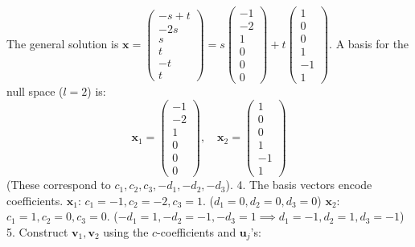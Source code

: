 \documentclass[11pt]{article}
\theoremstyle{definition}
\theoremstyle{remark}
\newcommand{\vecu}{\mathbf{u}}
\newcommand{\vecv}{\mathbf{v}}
\newcommand{\vecx}{\mathbf{x}}
\begin{document}
    The general solution is $\vecx = \begin{pmatrix} -s+t \\ -2s \\ s \\ t \\ -t \\ t \end{pmatrix} = s \begin{pmatrix} -1 \\ -2 \\ 1 \\ 0 \\ 0 \\ 0 \end{pmatrix} + t \begin{pmatrix} 1 \\ 0 \\ 0 \\ 1 \\ -1 \\ 1 \end{pmatrix}$.
    A basis for the null space ($l=2$) is:
    \[ \vecx_1 = \begin{pmatrix} -1 \\ -2 \\ 1 \\ 0 \\ 0 \\ 0 \end{pmatrix}, \quad \vecx_2 = \begin{pmatrix} 1 \\ 0 \\ 0 \\ 1 \\ -1 \\ 1 \end{pmatrix} \]
    (These correspond to $c_1, c_2, c_3, -d_1, -d_2, -d_3$).
4.  The basis vectors encode coefficients.
    $\vecx_1$: $c_1=-1, c_2=-2, c_3=1$. ($d_1=0, d_2=0, d_3=0$)
    $\vecx_2$: $c_1=1, c_2=0, c_3=0$. ($-d_1=1, -d_2=-1, -d_3=1 \implies d_1=-1, d_2=1, d_3=-1$)
5.  Construct $\vecv_1, \vecv_2$ using the $c$-coefficients and $\vecu_j$'s:
\end{document}
